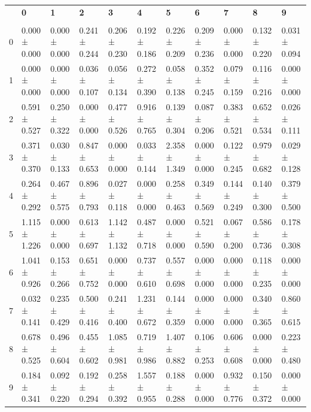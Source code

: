 \begingroup
\scriptsize
\setlength{\tabcolsep}{3pt}
\begin{tabular}{lllllllllll}
\toprule
 & \textbf{0} & \textbf{1} & \textbf{2} & \textbf{3} & \textbf{4} & \textbf{5} & \textbf{6} & \textbf{7} & \textbf{8} & \textbf{9} \\
  &  &  &  &  &  &  &  &  &  &  \\
\midrule
0 & 0.000 ± 0.000 & 0.000 ± 0.000 & 0.241 ± 0.244 & 0.206 ± 0.230 & 0.192 ± 0.186 & 0.226 ± 0.209 & 0.209 ± 0.236 & 0.000 ± 0.000 & 0.132 ± 0.220 & 0.031 ± 0.094 \\
1 & 0.000 ± 0.000 & 0.000 ± 0.000 & 0.036 ± 0.107 & 0.056 ± 0.134 & 0.272 ± 0.390 & 0.058 ± 0.138 & 0.352 ± 0.245 & 0.079 ± 0.159 & 0.116 ± 0.216 & 0.000 ± 0.000 \\
2 & 0.591 ± 0.527 & 0.250 ± 0.322 & 0.000 ± 0.000 & 0.477 ± 0.526 & 0.916 ± 0.765 & 0.139 ± 0.304 & 0.087 ± 0.206 & 0.383 ± 0.521 & 0.652 ± 0.534 & 0.026 ± 0.111 \\
3 & 0.371 ± 0.370 & 0.030 ± 0.133 & 0.847 ± 0.653 & 0.000 ± 0.000 & 0.033 ± 0.144 & 2.358 ± 1.349 & 0.000 ± 0.000 & 0.122 ± 0.245 & 0.979 ± 0.682 & 0.029 ± 0.128 \\
4 & 0.264 ± 0.292 & 0.467 ± 0.575 & 0.896 ± 0.793 & 0.027 ± 0.118 & 0.000 ± 0.000 & 0.258 ± 0.463 & 0.349 ± 0.569 & 0.144 ± 0.249 & 0.140 ± 0.300 & 0.379 ± 0.500 \\
5 & 1.115 ± 1.226 & 0.000 ± 0.000 & 0.613 ± 0.697 & 1.142 ± 1.132 & 0.487 ± 0.718 & 0.000 ± 0.000 & 0.521 ± 0.590 & 0.067 ± 0.200 & 0.586 ± 0.736 & 0.178 ± 0.308 \\
6 & 1.041 ± 0.926 & 0.153 ± 0.266 & 0.651 ± 0.752 & 0.000 ± 0.000 & 0.737 ± 0.610 & 0.557 ± 0.698 & 0.000 ± 0.000 & 0.000 ± 0.000 & 0.118 ± 0.235 & 0.000 ± 0.000 \\
7 & 0.032 ± 0.141 & 0.235 ± 0.429 & 0.500 ± 0.416 & 0.241 ± 0.400 & 1.231 ± 0.672 & 0.144 ± 0.359 & 0.000 ± 0.000 & 0.000 ± 0.000 & 0.340 ± 0.365 & 0.860 ± 0.615 \\
8 & 0.678 ± 0.525 & 0.496 ± 0.604 & 0.455 ± 0.602 & 1.085 ± 0.981 & 0.719 ± 0.986 & 1.407 ± 0.882 & 0.106 ± 0.253 & 0.606 ± 0.608 & 0.000 ± 0.000 & 0.223 ± 0.480 \\
9 & 0.184 ± 0.341 & 0.092 ± 0.220 & 0.192 ± 0.294 & 0.258 ± 0.392 & 1.557 ± 0.955 & 0.188 ± 0.288 & 0.000 ± 0.000 & 0.932 ± 0.776 & 0.150 ± 0.372 & 0.000 ± 0.000 \\
\bottomrule
\end{tabular}

\endgroup
